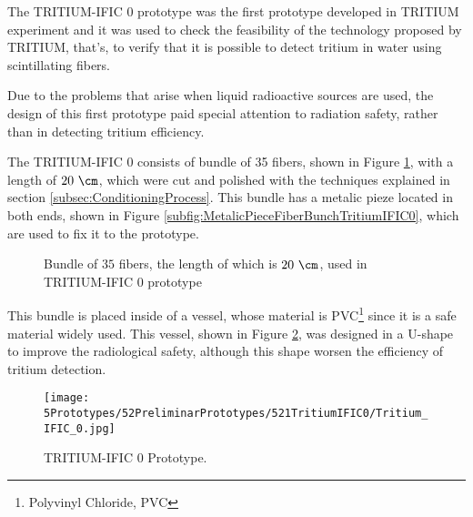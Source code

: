 The TRITIUM-IFIC 0 prototype was the first prototype developed in TRITIUM experiment and it was used to check the feasibility of the technology proposed by TRITIUM, that's, to verify that it is possible to detect tritium in water using scintillating fibers.

Due to the problems that arise when liquid radioactive sources are used, the design of this first prototype paid special attention to radiation safety, rather than in detecting tritium efficiency.

The TRITIUM-IFIC 0 consists of bundle of 35 fibers, shown in Figure \ref{fig:FiberBundleOfTritiumIFIC0}, with a length of $20~\cm$, which were cut and polished with the techniques explained in section \ref{subsec:ConditioningProcess}. This bundle has a metalic pieze located in both ends, shown in Figure \ref{subfig:MetalicPieceFiberBunchTritiumIFIC0}, which are used to fix it to the prototype.

\begin{figure}[h]
 \centering
    \newline
 \caption{Bundle of $35$ fibers, the length of which is $20~\cm$, used in TRITIUM-IFIC 0 prototype}
 \label{fig:FiberBundleOfTritiumIFIC0}
\end{figure}

This bundle is placed inside of a vessel, whose material is PVC\footnote{Polyvinyl Chloride, PVC}  since it is a safe material widely used. This vessel, shown in Figure \ref{fig:TritiumIFIC0}, was designed in a U-shape to improve the radiological safety, although this shape worsen the efficiency of tritium detection.

\begin{figure}[h]
\centering
\texttt{[image: 5Prototypes/52PreliminarPrototypes/521TritiumIFIC0/Tritium\_IFIC\_0.jpg]}
\caption{TRITIUM-IFIC 0 Prototype.\label{fig:TritiumIFIC0}}
\end{figure}

